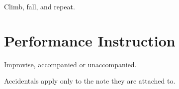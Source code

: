 \documentclass{article}
\begin{document}
Climb, fall, and repeat.

\section*{Performance Instruction}
Improvise, accompanied or unaccompanied.

\noindent
Accidentals apply only to the note they are attached to.
\end{document}
